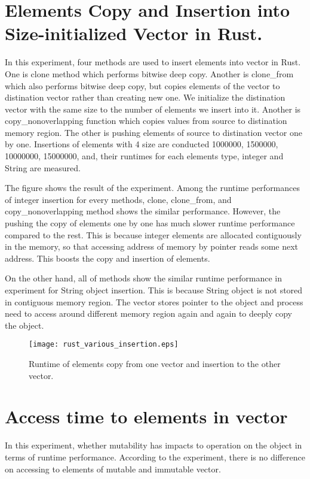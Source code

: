 \section{Elements Copy and Insertion into Size-initialized Vector in Rust.}
\label{sec:history}
In this experiment, four methods are used to insert elements into vector in Rust. One is clone method which performs bitwise deep copy. 
Another is clone\_from which also performs bitwise deep copy, but copies elements of the vector to distination vector rather than 
creating new one. We initialize the distination vector with the same size to the number of elements we insert into it. 
Another is copy\_nonoverlapping function which copies values from source to distination memory region. 
The other is pushing elements of source to distination vector one by one. Insertions of elements with 4 size are conducted 1000000, 1500000, 10000000, 15000000, and, 
their runtimes for each elements type, integer and String are measured. 


The figure shows the result of the experiment. Among the runtime performances of integer insertion for every methods, 
clone, clone\_from, and copy\_nonoverlapping method shows the similar performance. However, the pushing the copy of elements one by one has much slower runtime performance 
compared to the rest. This is because integer elements are allocated contiguously in the memory, so that accessing address of memory by pointer reads some next address. 
This boosts the copy and insertion of elements. 

On the other hand, all of methods show the similar runtime performance in experiment for String object insertion. 
This is because String object is not stored in contiguous memory region. The vector stores pointer to the object and 
process need to access around different memory region again and again to deeply copy the object.

\begin{figure}[htb]
    \texttt{[image: rust\_various\_insertion.eps]}
    \caption{Runtime of elements copy from one vector and insertion to the other vector.}
    \label{fig:Sampling}
\end{figure}



\section{Access time to elements in vector}
\label{sec:history}
In this experiment, whether mutability has impacts to operation on the object in terms of runtime performance. 
According to the experiment, there is no difference on accessing to elements of mutable and immutable vector.

